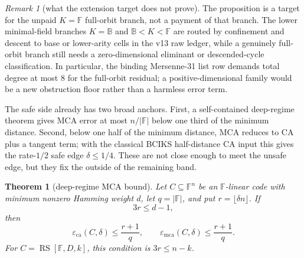 \documentclass[a4paper,11pt]{amsart}
\newtheorem{theorem}{Theorem}[section]
\theoremstyle{remark}
\newtheorem{remark}[remark]{Remark}
\newcommand{\F}{\mathbb F}
\newcommand{\B}{\mathbb B}
\newcommand{\RS}{\operatorname{RS}}
\newcommand{\emca}{\varepsilon_{\mathrm{mca}}}
\newcommand{\eca}{\varepsilon_{\mathrm{ca}}}
\begin{document}
\begin{remark}[what the extension target does not prove]\label{rem:extension-target-nonclaim}
The proposition is a target for the unpaid \(K=\F\) full-orbit branch, not a payment of that branch.  The lower minimal-field branches \(K=\B\) and \(\B<K<\F\) are routed by confinement and descent to base or lower-arity cells in the v13 raw ledger, while a genuinely full-orbit branch still needs a zero-dimensional eliminant or descended-cycle classification.  In particular, the binding Mersenne-31 list row demands total degree at most \(8\) for the full-orbit residual; a positive-dimensional family would be a new obstruction floor rather than a harmless error term.
\end{remark}

The safe side already has two broad anchors.  First, a self-contained deep-regime theorem gives MCA error at most \(n/|\F|\) below one third of the minimum distance.  Second, below one half of the minimum distance, MCA reduces to CA plus a tangent term; with the classical BCIKS half-distance CA input \cite{BCIKS20} this gives the rate-\(1/2\) safe edge \(\delta\le 1/4\).  These are not close enough to meet the unsafe edge, but they fix the outside of the remaining band.

\begin{theorem}[deep-regime MCA bound]\label{thm:gf-deep-mca}
Let \(C\subseteq\F^n\) be an \(\F\)-linear code with minimum nonzero Hamming weight \(d\), let \(q=|\F|\), and put \(r=\lfloor\delta n\rfloor\).  If
\[
        3r\le d-1,
\]
then
\[
        \eca(C,\delta)\le \frac{r+1}{q},
        \qquad
        \emca(C,\delta)\le \frac{r+1}{q}.
\]
For \(C=\RS[\F,D,k]\), this condition is \(3r\le n-k\).
\end{theorem}
\end{document}
